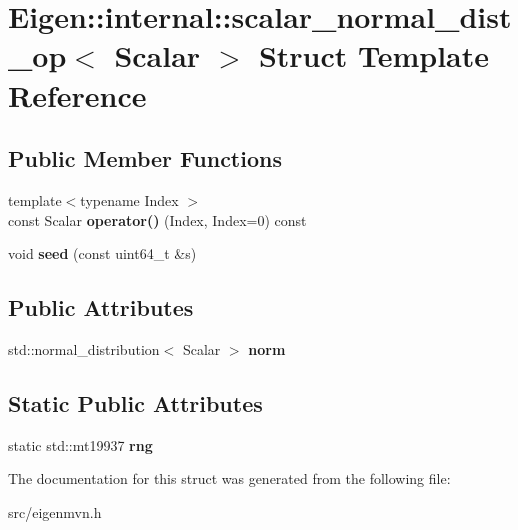 \hypertarget{structEigen_1_1internal_1_1scalar__normal__dist__op}{\section{Eigen\+:\+:internal\+:\+:scalar\+\_\+normal\+\_\+dist\+\_\+op$<$ Scalar $>$ Struct Template Reference}
\label{structEigen_1_1internal_1_1scalar__normal__dist__op}
}
\subsection*{Public Member Functions}
\begin{DoxyCompactItemize}
\item 
\hypertarget{structEigen_1_1internal_1_1scalar__normal__dist__op_a06ff4908382c1360169dce38b93463da}{{\footnotesize template$<$typename Index $>$ }\\const Scalar {\bfseries operator()} (Index, Index=0) const }\label{structEigen_1_1internal_1_1scalar__normal__dist__op_a06ff4908382c1360169dce38b93463da}

\item 
\hypertarget{structEigen_1_1internal_1_1scalar__normal__dist__op_a7da50316f73031ed28ed288405abf930}{void {\bfseries seed} (const uint64\+\_\+t \&s)}\label{structEigen_1_1internal_1_1scalar__normal__dist__op_a7da50316f73031ed28ed288405abf930}

\end{DoxyCompactItemize}
\subsection*{Public Attributes}
\begin{DoxyCompactItemize}
\item 
\hypertarget{structEigen_1_1internal_1_1scalar__normal__dist__op_a1a5308c778e5e490d0fd4d3384058737}{std\+::normal\+\_\+distribution$<$ Scalar $>$ {\bfseries norm}}\label{structEigen_1_1internal_1_1scalar__normal__dist__op_a1a5308c778e5e490d0fd4d3384058737}

\end{DoxyCompactItemize}
\subsection*{Static Public Attributes}
\begin{DoxyCompactItemize}
\item 
\hypertarget{structEigen_1_1internal_1_1scalar__normal__dist__op_a34f1e2a4d6e148efc6afa4682db20b6e}{static std\+::mt19937 {\bfseries rng}}\label{structEigen_1_1internal_1_1scalar__normal__dist__op_a34f1e2a4d6e148efc6afa4682db20b6e}

\end{DoxyCompactItemize}


The documentation for this struct was generated from the following file\+:\begin{DoxyCompactItemize}
\item 
src/eigenmvn.\+h\end{DoxyCompactItemize}
